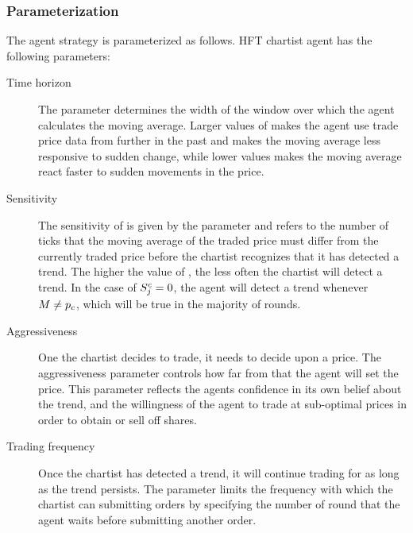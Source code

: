 \subsubsection{Parameterization}
The agent strategy is parameterized as follows. HFT chartist agent  has the following parameters:
\begin{description}
\item[Time horizon] The parameter  determines the width of the window over which the agent calculates the moving average. Larger values of  makes the agent use trade price data from further in the past and makes the moving average less responsive to sudden change, while lower values makes the moving average react faster to sudden movements in the price. 
\item[Sensitivity] The sensitivity of  is given by the parameter  and refers to the number of ticks that the moving average of the traded price must differ from the currently traded price before the chartist recognizes that it has detected a trend. The higher the value of , the less often the chartist will detect a trend. In the case of $S^c_{j} = 0$, the agent will detect a trend whenever $M \neq p_c$, which will be true in the majority of rounds.
\item[Aggressiveness] One the chartist decides to trade, it needs to decide upon a price. The aggressiveness parameter  controls how far from \currentprice that the agent will set the price. This parameter reflects the agents confidence in its own belief about the trend, and the willingness of the agent to trade at sub-optimal prices in order to obtain or sell off shares.
\item[Trading frequency] Once the chartist has detected a trend, it will continue trading for as long as the trend persists. The parameter  limits the frequency with which the chartist can submitting orders by specifying the number of round that the agent waits before submitting another order.
\end{description}

